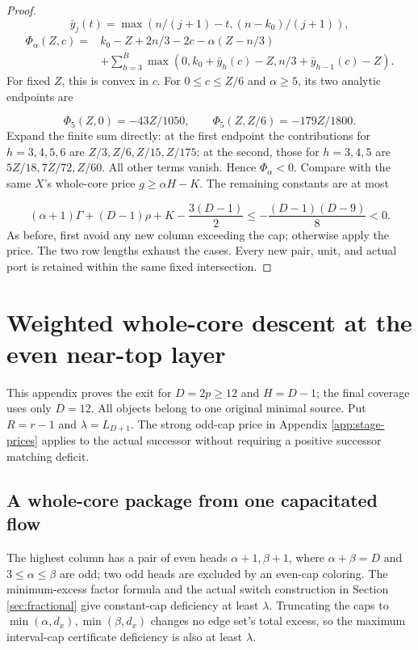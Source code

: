 \documentclass[11pt,a4paper]{article}
\theoremstyle{definition}
\begin{document}
\begin{proof}
\[
\bar y_j(t)=\max(n/(j+1)-t,(n-k_0)/(j+1)),
\]
\[
\begin{split}
\Phi_\alpha(Z,c)={}&k_0-Z+2n/3-2c-\alpha(Z-n/3)\\
&+\sum_{h=3}^{B}\max(0,k_0+\bar y_h(c)-Z,n/3+\bar y_{h-1}(c)-Z).
\end{split}
\]
For fixed $Z$, this is convex in $c$.
For $0\le c\le Z/6$ and $\alpha\ge5$, its two analytic endpoints are

\[
\Phi_5(Z,0)=-43Z/1050,\qquad
\Phi_5(Z,Z/6)=-179Z/1800.
\]
Expand the finite sum directly: at the first endpoint the contributions
for $h=3,4,5,6$ are $Z/3,Z/6,Z/15,Z/175$;
at the second, those for $h=3,4,5$ are $5Z/18,7Z/72,Z/60$.
All other terms vanish. Hence $\Phi_\alpha<0$.
Compare with the same $X$'s whole-core price $g\ge\alpha H-K$.
The remaining constants are at most

\[
(\alpha+1)\Gamma+(D-1)\rho+K-\frac{3(D-1)}2
\le-\frac{(D-1)(D-9)}8<0.
\]
As before, first avoid any new column exceeding the cap; otherwise apply the price.
The two row lengths exhaust the cases.
Every new pair, unit, and actual port is retained within the same fixed intersection.
\end{proof}

\section{Weighted whole-core descent at the even near-top layer}\label{app:even-weighted}
This appendix proves the exit for $D=2p\ge12$ and $H=D-1$; the final coverage uses only $D=12$. All objects belong to one original minimal source. Put $R=r-1$ and $\lambda=L_{D+1}$. The strong odd-cap price in Appendix \ref{app:stage-prices} applies to the actual successor without requiring a positive successor matching deficit.
\subsection{A whole-core package from one capacitated flow}
The highest column has a pair of even heads $\alpha+1,\beta+1$, where $\alpha+\beta=D$ and $3\le\alpha\le\beta$ are odd; two odd heads are excluded by an even-cap coloring. The minimum-excess factor formula and the actual switch construction in Section \ref{sec:fractional} give constant-cap deficiency at least $\lambda$. Truncating the caps to $\min(\alpha,d_x),\min(\beta,d_x)$ changes no edge set's total excess, so the maximum interval-cap certificate deficiency is also at least $\lambda$.
\end{document}
